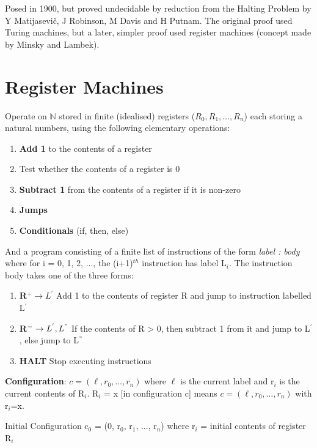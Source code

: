 \documentclass{article}
\newenvironment{definition}{\par\color{blue}}{\par}
\begin{document}
Posed in 1900, but proved undecidable by reduction from the Halting Problem by Y Matijasevič, J Robinson, M Davis and H Putnam. The original proof used Turing machines, but a later, simpler proof used register machines (concept made by Minsky and Lambek). 

\section{Register Machines}
\begin{definition}
Operate on $ \mathbb{N} $ stored in finite (idealised) registers ($R_{0}, R_{1}, ..., R_{n}$) each storing a natural numbers, using the following elementary operations:
\begin{enumerate}
    \item \textbf{Add 1} to the contents of a register
    \item Test whether the contents of a register is 0
    \item \textbf{Subtract 1} from the contents of a register if it is non-zero
    \item \textbf{Jumps}
    \item \textbf{Conditionals} (if, then, else)
\end{enumerate}
And a program consisting of a finite list of instructions of the form \textit{label : body} where for i = 0, 1, 2, ..., the (i+1)$^{th}$ instruction has label L$_{i}$. The instruction body takes one of the three forms:
\begin{enumerate}
    \item \textbf{R$^{+} \rightarrow L^{'}$}
    \subitem Add 1 to the contents of register R and jump to instruction labelled L$^{'}$
    \item \textbf{R$^{-} \rightarrow L^{'}, L^{"}$}
    \subitem If the contents of R > 0, then subtract 1 from it and jump to L$^{'}$, else jump to L$^{"}$
    \item \textbf{HALT}
    \subitem Stop executing instructions
\end{enumerate}

\bigskip
\noindent
\textbf{Configuration}: $
c=\left(\ell, r_{0}, \ldots, r_{n}\right)
$ where $
\ell
$ is the current label and r$_{i}$ is the current contents of R$_{i}$. R$_{i}$ = x [in configuration c] means $
c=\left(\ell, r_{0}, \ldots, r_{n}\right)
$ with r$_{i}$=x. 

\noindent
Initial Configuration c$_{0}$ = (0, r$_{0}$, r$_{1}$, ..., r$_{n}$) where r$_{i}$ = initial contents of register R$_{i}$


\end{definition}
\end{document}
